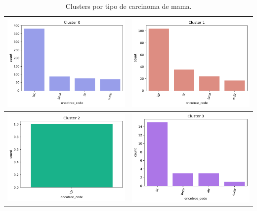 \begin{table}[!htb]
	\begin{center} 
		\begin{tabular}{ |c|c| }
			\hline 
			\includegraphics[width=.5\textwidth]{NOTEBOOK/IMAGENES_BIRCH_CLUSTERING/1_Cluster_0_oncotree_code} 
			& \includegraphics[width=.5\textwidth]{NOTEBOOK/IMAGENES_BIRCH_CLUSTERING/1_Cluster_1_oncotree_code} 
			\\  \hline
			\includegraphics[width=.5\textwidth]{NOTEBOOK/IMAGENES_BIRCH_CLUSTERING/1_Cluster_2_oncotree_code} 
			& \includegraphics[width=.5\textwidth]{NOTEBOOK/IMAGENES_BIRCH_CLUSTERING/1_Cluster_3_oncotree_code} 
			\\  \hline            
		\end{tabular} 
		\caption{Clusters por tipo de carcinoma de mama.}
		\label{carcinoma_cluster}
	\end{center} 
\end{table}

